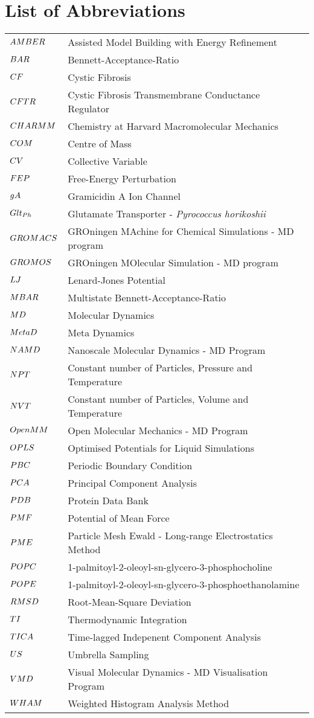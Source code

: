 \chapter*{List of Abbreviations}
\label{chap:abbrev}

\begin{center}
\begin{bfseries}
\vskip 5mm
\newcommand\nomenclature[2]{#1 & #2 \\}
\begin{longtable}{@{}p{3cm}@{}p{\dimexpr\textwidth-1cm\relax}@{}}
\nomenclature{${\small AMBER}$}    {Assisted Model Building with Energy Refinement}
\nomenclature{${\small BAR}$}      {Bennett-Acceptance-Ratio}
\nomenclature{${\small CF}$}        {Cystic Fibrosis}
\nomenclature{${\small CFTR}$}      {Cystic Fibrosis Transmembrane Conductance Regulator}
\nomenclature{${\small CHARMM}$}   {Chemistry at Harvard Macromolecular Mechanics}
\nomenclature{${\small COM}$}      {Centre of Mass}
\nomenclature{${\small CV}$}       {Collective Variable}
\nomenclature{${\small FEP}$}      {Free-Energy Perturbation}
\nomenclature{${\small gA}$}       {Gramicidin A Ion Channel}
\nomenclature{${\small Glt_{Ph}}$} {Glutamate Transporter - \textit{Pyrococcus horikoshii}}
\nomenclature{${\small GROMACS}$}  {GROningen MAchine for Chemical Simulations - MD program}
\nomenclature{${\small GROMOS}$}   {GROningen MOlecular Simulation - MD program}
\nomenclature{${\small LJ}$}       {Lenard-Jones Potential}
\nomenclature{${\small MBAR}$}     {Multistate Bennett-Acceptance-Ratio}
\nomenclature{${\small MD}$}       {Molecular Dynamics}
\nomenclature{${\small MetaD}$}    {Meta Dynamics}
\nomenclature{${\small NAMD}$}     {Nanoscale Molecular Dynamics - MD Program}
\nomenclature{${\small NPT}$}      {Constant number of Particles, Pressure and Temperature}
\nomenclature{${\small NVT}$}      {Constant number of Particles, Volume and Temperature}
\nomenclature{${\small OpenMM}$}   {Open Molecular Mechanics - MD Program}
\nomenclature{${\small OPLS}$}     {Optimised Potentials for Liquid Simulations}
\nomenclature{${\small PBC}$}      {Periodic Boundary Condition}
\nomenclature{${\small PCA}$}      {Principal Component Analysis}
\nomenclature{${\small PDB}$}      {Protein Data Bank}
\nomenclature{${\small PMF}$}      {Potential of Mean Force}
\nomenclature{${\small PME}$}      {Particle Mesh Ewald - Long-range Electrostatics Method}
\nomenclature{${\small POPC}$}     {1-palmitoyl-2-oleoyl-sn-glycero-3-phosphocholine}
\nomenclature{${\small POPE}$}     {1-palmitoyl-2-oleoyl-sn-glycero-3-phosphoethanolamine}
\nomenclature{${\small RMSD}$}     {Root-Mean-Square Deviation}
\nomenclature{${\small TI}$}       {Thermodynamic Integration}
\nomenclature{${\small TICA}$}     {Time-lagged Indepenent Component Analysis}
\nomenclature{${\small US}$}       {Umbrella Sampling}
\nomenclature{${\small VMD}$}      {Visual Molecular Dynamics - MD Visualisation Program}
\nomenclature{${\small WHAM}$}     {Weighted Histogram Analysis Method}
\end{longtable}
\end{bfseries}
\end{center}
